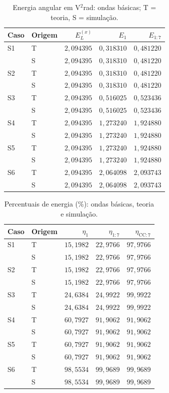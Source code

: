 \begin{table}[H]
\centering
\footnotesize\setlength{\tabcolsep}{3.5pt}
\caption{Energia angular em V$^2$rad: ondas básicas; T = teoria, S = simulação.}\label{tab:energia_abs1}
\begin{tabular}{llrrr}\hline
Caso & Origem & $E_L^{(x)}$ & $E_1$ & $E_{1:7}$ \\ \hline
S1 & T & $2{,}094395$ & $0{,}318310$ & $0{,}481220$ \\
 & S & $2{,}094395$ & $0{,}318310$ & $0{,}481220$ \\
S2 & T & $2{,}094395$ & $0{,}318310$ & $0{,}481220$ \\
 & S & $2{,}094395$ & $0{,}318310$ & $0{,}481220$ \\
S3 & T & $2{,}094395$ & $0{,}516025$ & $0{,}523436$ \\
 & S & $2{,}094395$ & $0{,}516025$ & $0{,}523436$ \\
S4 & T & $2{,}094395$ & $1{,}273240$ & $1{,}924880$ \\
 & S & $2{,}094395$ & $1{,}273240$ & $1{,}924880$ \\
S5 & T & $2{,}094395$ & $1{,}273240$ & $1{,}924880$ \\
 & S & $2{,}094395$ & $1{,}273240$ & $1{,}924880$ \\
S6 & T & $2{,}094395$ & $2{,}064098$ & $2{,}093743$ \\
 & S & $2{,}094395$ & $2{,}064098$ & $2{,}093743$ \\
\hline\end{tabular}
\end{table}
\begin{table}[H]
\centering
\footnotesize\setlength{\tabcolsep}{3.5pt}
\caption{Percentuais de energia (\%): ondas básicas, teoria e simulação.}\label{tab:energias}
\begin{tabular}{llrrr}\hline
Caso & Origem & $\eta_1$ & $\eta_{1:7}$ & $\eta_{\mathrm{CC}:7}$ \\ \hline
S1 & T & $15{,}1982$ & $22{,}9766$ & $97{,}9766$ \\
 & S & $15{,}1982$ & $22{,}9766$ & $97{,}9766$ \\
S2 & T & $15{,}1982$ & $22{,}9766$ & $97{,}9766$ \\
 & S & $15{,}1982$ & $22{,}9766$ & $97{,}9766$ \\
S3 & T & $24{,}6384$ & $24{,}9922$ & $99{,}9922$ \\
 & S & $24{,}6384$ & $24{,}9922$ & $99{,}9922$ \\
S4 & T & $60{,}7927$ & $91{,}9062$ & $91{,}9062$ \\
 & S & $60{,}7927$ & $91{,}9062$ & $91{,}9062$ \\
S5 & T & $60{,}7927$ & $91{,}9062$ & $91{,}9062$ \\
 & S & $60{,}7927$ & $91{,}9062$ & $91{,}9062$ \\
S6 & T & $98{,}5534$ & $99{,}9689$ & $99{,}9689$ \\
 & S & $98{,}5534$ & $99{,}9689$ & $99{,}9689$ \\
\hline\end{tabular}
\end{table}
